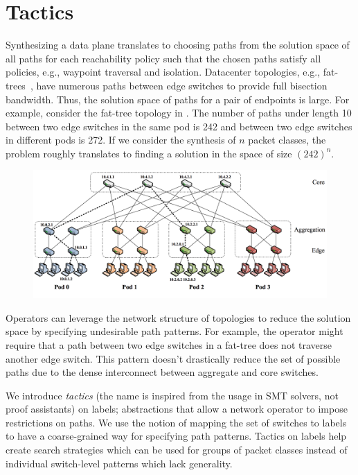 \section{Tactics} \label{sec:tactic}
Synthesizing a data plane translates to choosing paths from
the solution space of all paths for each reachability policy such
that the chosen paths satisfy all policies, e.g., waypoint traversal
and isolation. Datacenter topologies, e.g., fat-trees~\cite{fattree},
have numerous paths between edge switches to provide full bisection
bandwidth.  Thus, the solution space of paths for a pair of endpoints
is large.  For example, consider the fat-tree topology in
.  The number of paths under length 10 between two
edge switches in the same pod is 242 and between two edge switches in
different pods is 272.  If we consider the synthesis of $n$ packet
classes, the problem roughly translates to finding a solution in the
space of size $(242)^n$.
\begin{figure}
	\includegraphics[width=0.9\columnwidth, right]{figures/fattree.png}
	\label{fig:fattree}
\end{figure}
Operators can leverage the network structure of topologies to reduce
the solution space by specifying undesirable path patterns.  For
example, the operator might require that a path between two edge switches in a
fat-tree does not traverse another edge switch.  This pattern doesn't
drastically reduce the set of possible paths due to the dense
interconnect between aggregate and core switches. 

We introduce \emph{tactics} (the name is inspired from the usage in SMT solvers, not 
proof assistants)
on labels; abstractions that allow a
network operator to impose restrictions on paths. 
We use the notion of mapping the set of switches to labels to 
have a coarse-grained way for specifying path patterns. Tactics on labels 
help create search strategies which can be used for groups
of packet classes instead of individual switch-level patterns which
lack generality.

